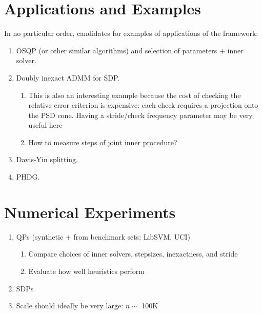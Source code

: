 \documentclass[11pt]{article}
\begin{document}
\section{Applications and Examples}
In no particular order, candidates for examples of applications of the framework:
\begin{enumerate}
    \item OSQP (or other similar algorithms) and selection of parameters + inner solver.
    \item Doubly inexact ADMM for SDP.
    \begin{enumerate}
        \item This is also an interesting example because the cost of checking the relative error criterion is expensive: each check requires a projection onto the PSD cone.
        Having a stride/check frequency parameter may be very useful here
        \item How to measure steps of joint inner procedure?
    \end{enumerate}
    \item Davis-Yin splitting.
    \item PHDG.
\end{enumerate}

\section{Numerical Experiments}
\begin{enumerate}
    \item QPs (synthetic + from benchmark sets: LibSVM, UCI)
    \begin{enumerate}
        \item Compare choices of inner solvers, stepsizes, inexactness, and stride
        \item Evaluate how well heuristics perform
    \end{enumerate}
    \item SDPs
    \item Scale should ideally be very large: $n\sim$ 100K
\end{enumerate}
\end{document}
